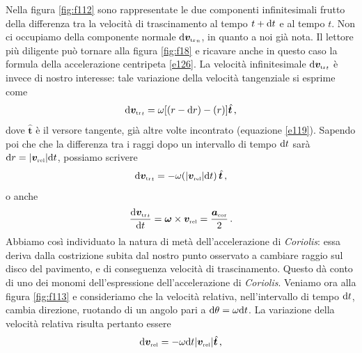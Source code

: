 \noindent Nella figura \ref{fig:f112} sono rappresentate le due componenti infinitesimali frutto della
differenza tra la velocit\`a di trascinamento al tempo $t+{\rm d}t$ e al tempo $t$.
Non ci occupiamo della componente normale
${\rm d}{{\bm v}_{\scriptscriptstyle{{\rm tr}}}}_{\scriptscriptstyle{n}}$, in quanto a noi gi\`a
nota.
Il lettore pi\`u diligente pu\`o tornare alla figura \ref{fig:f18} e ricavare anche in questo caso
la formula della accelerazione centripeta \ref{e126}.
La velocit\`a infinitesimale 
${{\rm d}{{\bm v}_{\scriptscriptstyle{{\rm tr}}}}}_{\scriptscriptstyle{t}}$ \`e invece
di nostro interesse: tale variazione della velocit\`a tangenziale si esprime come
\begin{equation}
{{\rm d}{{\bm v}_{\scriptscriptstyle{{\rm tr}}}}}_{\scriptscriptstyle{t}}=
\omega[(r -{\rm d}r) - (r)]\hat{{\bm t}}\,,
\label{e139}
\end{equation}
\noindent dove $\hat{\bm t}$ \`e il versore tangente, gi\`a altre volte incontrato (equazione \ref{e119}). Sapendo poi che che la differenza tra i raggi dopo 
un intervallo di tempo ${\rm d}t$ sar\`a ${\rm d} r= |{\bm v}_{\scriptscriptstyle{{\rm rel}}}|
{\rm d}t$, possiamo scrivere 
\begin{equation}
{{\rm d}{{\bm v}_{\scriptscriptstyle{{\rm tr}}}}}_{\scriptscriptstyle{t}}=
-\omega
(|{\bm v}_{\scriptscriptstyle{{\rm rel}}}|{\rm d}t)\,
\hat{{\bm t}}\,,
\label{e140}
\end{equation}
\noindent o anche
\begin{equation}
{{{{\rm d}{{\bm v}_{\scriptscriptstyle{{\rm tr}}}}}_{\scriptscriptstyle{t}}}\over{{\rm d}t}}=
{\bm \omega} \times
{\bm v}_{\scriptscriptstyle{{\rm rel}}}=
{{\bm a}_{\scriptscriptstyle{{\rm cor}}}\over{2}}\,.
\label{e141}
\end{equation}
\noindent Abbiamo cos\`i individuato la natura di met\`a dell'accelerazione
di {\em Coriolis}: essa deriva dalla costrizione subita dal nostro punto osservato a
cambiare raggio sul disco del pavimento, e di conseguenza 
velocit\`a di trascinamento. Questo d\`a conto
di uno dei monomi dell'espressione dell'accelerazione di {\em Coriolis}.
Veniamo ora alla figura \ref{fig:f113} e consideriamo che la velocit\`a relativa, nell'intervallo di
tempo ${\rm d}t$, cambia direzione, ruotando di un angolo pari
a ${\rm d} \theta=\omega{\rm d}t$. 
La variazione della velocit\`a relativa risulta pertanto essere
\begin{equation}
{\rm d}{\bm v}_{\scriptscriptstyle{{\rm rel}}}=
-\omega {\rm d}t 
|{\bm v}_{\scriptscriptstyle{{\rm rel}}}|\hat{\bm t}\,,
\label{e142}
\end{equation}

